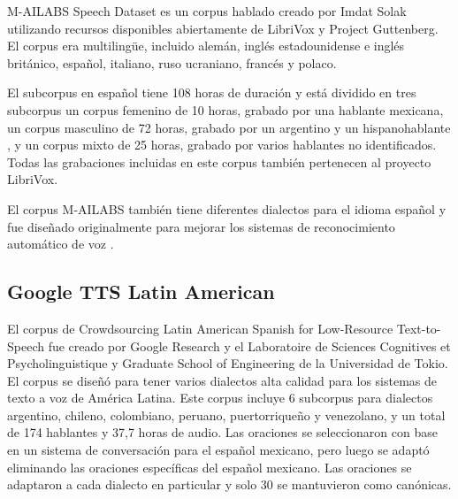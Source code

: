 M-AILABS Speech Dataset es un corpus hablado creado por Imdat Solak utilizando recursos disponibles abiertamente de LibriVox y Project Guttenberg. El corpus era multilingüe, incluido alemán, inglés estadounidense e inglés británico, español, italiano, ruso ucraniano, francés y polaco.

El subcorpus en español tiene 108 horas de duración y está  dividido en tres subcorpus\macb{\st{,}:} un corpus femenino de 10 horas, grabado por una hablante mexicana, un corpus masculino de 72 horas, grabado por un argentino y un hispanohablante , y un corpus mixto de 25 horas, grabado por varios hablantes no identificados. Todas las grabaciones incluidas en este corpus también pertenecen al proyecto LibriVox.


El corpus M-AILABS también tiene diferentes dialectos para el idioma español  y fue diseñado originalmente para mejorar los sistemas de reconocimiento automático de voz \cite{M-AILABS}.

\subsection{Google TTS Latin American}

El corpus de Crowdsourcing Latin American Spanish for Low-Resource Text-to-Speech fue creado por Google Research y el Laboratoire de Sciences Cognitives et Psycholinguistique y Graduate School of Engineering de la Universidad de Tokio. El corpus se diseñó para tener  varios dialectos  alta calidad para los sistemas de texto a voz de América Latina. Este corpus incluye 6 subcorpus para dialectos argentino, chileno, colombiano, peruano, puertorriqueño y venezolano, y un total de 174 hablantes y 37,7 horas de audio. Las oraciones se seleccionaron con base en un sistema de conversación para el español mexicano, pero luego se adaptó eliminando las oraciones específicas del español mexicano. Las oraciones se adaptaron a cada dialecto en particular y solo 30 se mantuvieron como canónicas.

